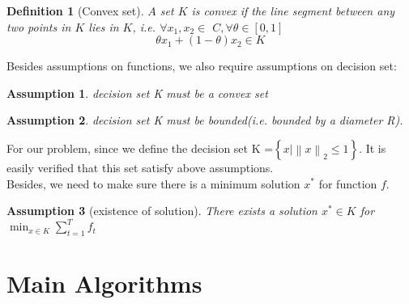 \documentclass[12pt]{article}
\newtheorem{definition}{Definition}
\newtheorem{assumption}{Assumption}
\begin{document}
\begin{definition}[Convex set]
     $A$ set $K$ is convex if the line segment between any two points in $K$ lies in $K$, i.e. $\forall x_1, x_2 \in$ $C, \forall \theta \in[0,1]$
$$
\theta x_1+(1-\theta) x_2 \in K
$$
\end{definition}
Besides assumptions on functions, we also require assumptions on decision set: 
\begin{assumption}
    decision set K must be a convex set
\end{assumption}
\begin{assumption}
     decision set K must be bounded(i.e. bounded by a diameter R). 
\end{assumption}
For our problem, since we define the decision set K =$\left \{ x | \left \| x \right \|_2\leq 1 \right \}$. It is easily verified that this set satisfy above assumptions.\\
Besides, we need to make sure there is a minimum solution $x^*$ for function $f$.
\begin{assumption}[existence of solution]
    There exists a solution $x^* \in K$ for $\min_{x\in K} \sum_{t=1}^{T}f_t$
\end{assumption}

\section{Main Algorithms}
\end{document}
